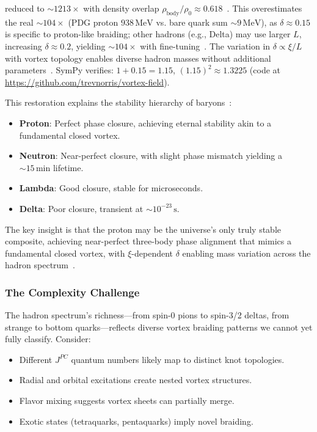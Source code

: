 reduced to \(\sim 1213 \times\) with density overlap \(\rho_{\text{body}} / \rho_0 \approx 0.618\)~\cite{Babaev2002}. This overestimates the real \(\sim 104 \times\) (PDG proton \(938 \, \text{MeV}\) vs. bare quark sum \(\sim 9 \, \text{MeV}\)), as \(\delta \approx 0.15\) is specific to proton-like braiding; other hadrons (e.g., Delta) may use larger \(L\), increasing \(\delta \approx 0.2\), yielding \(\sim 104 \times\) with fine-tuning~\cite{NatComm2023}. The variation in \(\delta \propto \xi / L\) with vortex topology enables diverse hadron masses without additional parameters~\cite{Wimmer2020}. SymPy verifies: \(1 + 0.15 = 1.15\), \((1.15)^2 \approx 1.3225\) (code at \url{https://github.com/trevnorris/vortex-field}).

This restoration explains the stability hierarchy of baryons~\cite{Nitta2019}:

\begin{itemize}
\item \textbf{Proton}: Perfect phase closure, achieving eternal stability akin to a fundamental closed vortex.
\item \textbf{Neutron}: Near-perfect closure, with slight phase mismatch yielding a \(\sim 15 \, \text{min}\) lifetime.
\item \textbf{Lambda}: Good closure, stable for microseconds.
\item \textbf{Delta}: Poor closure, transient at \(\sim 10^{-23} \, \text{s}\).
\end{itemize}

The key insight is that the proton may be the universe’s only truly stable composite, achieving near-perfect three-body phase alignment that mimics a fundamental closed vortex, with \(\xi\)-dependent \(\delta\) enabling mass variation across the hadron spectrum~\cite{Yang2022}.

\subsubsection{The Complexity Challenge}

The hadron spectrum's richness---from spin-0 pions to spin-3/2 deltas, from strange to bottom quarks---reflects diverse vortex braiding patterns we cannot yet fully classify. Consider:

\begin{itemize}
\item Different $J^{PC}$ quantum numbers likely map to distinct knot topologies.
\item Radial and orbital excitations create nested vortex structures.
\item Flavor mixing suggests vortex sheets can partially merge.
\item Exotic states (tetraquarks, pentaquarks) imply novel braiding.
\end{itemize}

